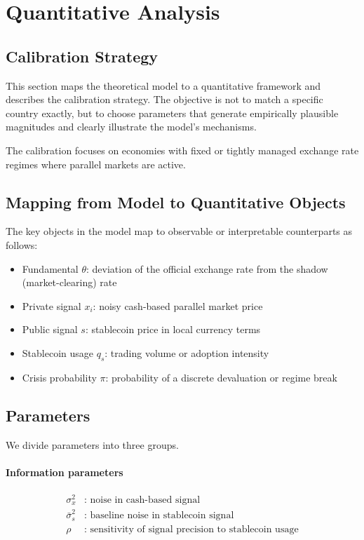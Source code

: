 \section{Quantitative Analysis}

\subsection{Calibration Strategy}

This section maps the theoretical model to a quantitative framework and describes the calibration strategy. The objective is not to match a specific country exactly, but to choose parameters that generate empirically plausible magnitudes and clearly illustrate the model's mechanisms.

The calibration focuses on economies with fixed or tightly managed exchange rate regimes where parallel markets are active.

\subsection{Mapping from Model to Quantitative Objects}

The key objects in the model map to observable or interpretable counterparts as follows:

\begin{itemize}
\item Fundamental $\theta$: deviation of the official exchange rate from the shadow (market-clearing) rate
\item Private signal $x_i$: noisy cash-based parallel market price
\item Public signal $s$: stablecoin price in local currency terms
\item Stablecoin usage $q_s$: trading volume or adoption intensity
\item Crisis probability $\pi$: probability of a discrete devaluation or regime break
\end{itemize}

\subsection{Parameters}

We divide parameters into three groups.

\paragraph{Information parameters}
\begin{align}
\sigma_x^2 &\text{: noise in cash-based signal} \\
\bar{\sigma}_s^2 &\text{: baseline noise in stablecoin signal} \\
\rho &\text{: sensitivity of signal precision to stablecoin usage}
\end{align}

